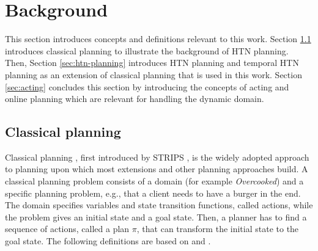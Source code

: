 \section{Background}\label{sec:background}

This section introduces concepts and definitions relevant to this work.
Section \ref{sec:classical-planning} introduces classical planning to illustrate the background of \ac{HTN} planning.
Then, Section \ref{sec:htn-planning} introduces \ac{HTN} planning and temporal \ac{HTN} planning as an extension of classical planning that is used in this work.
Section \ref{sec:acting} concludes this section by introducing the concepts of acting and online planning which are relevant for handling the dynamic domain.



\subsection{Classical planning}\label{sec:classical-planning}

Classical planning \citep{ghallabAutomatedPlanningTheory2004}, first introduced by STRIPS \citep{fikesSTRIPSNewApproach1971}, is the widely adopted approach to planning upon which most extensions and other planning approaches build.
A classical planning problem consists of a domain (for example \textit{Overcooked}) and a specific planning problem, e.g., that a client needs to have a burger in the end.
The domain specifies variables and state transition functions, called actions, while the problem gives an initial state and a goal state.
Then, a planner has to find a sequence of actions, called a plan $\pi$, that can transform the initial state to the goal state.
The following definitions are based on \citet[chap.~1,2]{ghallabAutomatedPlanningTheory2004} and \cite{hollerGuidingSearchHTN2019}.

